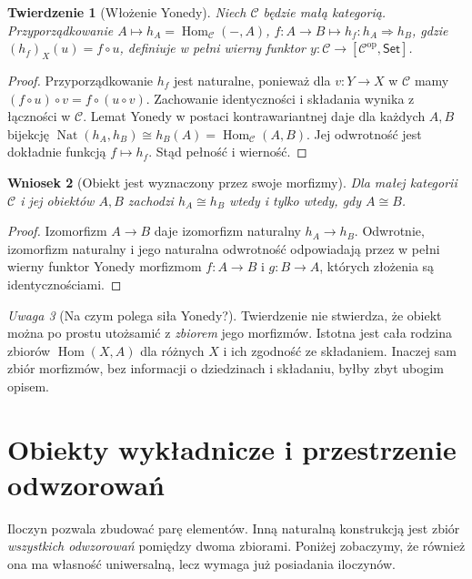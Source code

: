 \documentclass[11pt,a4paper]{article}
\numberwithin{equation}{section}
\theoremstyle{plain}
\newtheorem{twierdzenie}{Twierdzenie}[section]
\newtheorem{wniosek}[twierdzenie]{Wniosek}
\theoremstyle{definition}
\theoremstyle{remark}
\newtheorem{uwaga}[twierdzenie]{Uwaga}
\newcommand{\cat}[1]{\mathsf{#1}}
\newcommand{\Set}{\cat{Set}}
\newcommand{\Hom}{\operatorname{Hom}}
\newcommand{\Nat}{\operatorname{Nat}}
\newcommand{\op}{\mathrm{op}}
\begin{document}
\begin{twierdzenie}[Włożenie Yonedy]\label{tw:yoneda-embedding}
Niech $\mathcal C$ będzie małą kategorią. Przyporządkowanie $A\mapsto h_A=\Hom_{\mathcal C}(-,A)$, $f:A\to B\mapsto h_f:h_A\Rightarrow h_B$, gdzie $(h_f)_X(u)=f\circ u$, definiuje w pełni wierny funktor $y:\mathcal C\to[\mathcal C^{\op},\Set]$.
\end{twierdzenie}
\begin{proof}
Przyporządkowanie $h_f$ jest naturalne, ponieważ dla $v:Y\to X$ w $\mathcal C$ mamy $(f\circ u)\circ v=f\circ(u\circ v)$. Zachowanie identyczności i składania wynika z łączności w $\mathcal C$. Lemat Yonedy w postaci kontrawariantnej daje dla każdych $A,B$ bijekcję $\Nat(h_A,h_B)\cong h_B(A)=\Hom_{\mathcal C}(A,B)$. Jej odwrotność jest dokładnie funkcją $f\mapsto h_f$. Stąd pełność i wierność.
\end{proof}

\begin{wniosek}[Obiekt jest wyznaczony przez swoje morfizmy]
Dla małej kategorii $\mathcal C$ i jej obiektów $A,B$ zachodzi $h_A\cong h_B$ wtedy i tylko wtedy, gdy $A\cong B$.
\end{wniosek}
\begin{proof}
Izomorfizm $A\to B$ daje izomorfizm naturalny $h_A\to h_B$. Odwrotnie, izomorfizm naturalny i jego naturalna odwrotność odpowiadają przez w pełni wierny funktor Yonedy morfizmom $f:A\to B$ i $g:B\to A$, których złożenia są identycznościami.
\end{proof}

\begin{uwaga}[Na czym polega siła Yonedy?]
Twierdzenie nie stwierdza, że obiekt można po prostu utożsamić z \emph{zbiorem} jego morfizmów. Istotna jest cała rodzina zbiorów $\Hom(X,A)$ dla różnych $X$ i ich zgodność ze składaniem. Inaczej sam zbiór morfizmów, bez informacji o dziedzinach i składaniu, byłby zbyt ubogim opisem.
\end{uwaga}


\section{Obiekty wykładnicze i przestrzenie odwzorowań}\label{sec:exponentials}

Iloczyn pozwala zbudować parę elementów. Inną naturalną konstrukcją jest zbiór \emph{wszystkich odwzorowań} pomiędzy dwoma zbiorami. Poniżej zobaczymy, że również ona ma własność uniwersalną, lecz wymaga już posiadania iloczynów.
\end{document}

